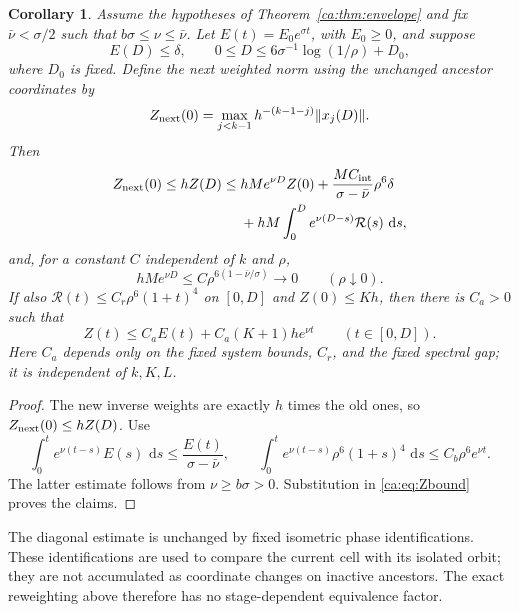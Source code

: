 \documentclass[11pt]{amsart}
\newtheorem{corollary}[theorem]{Corollary}
\theoremstyle{remark}
\numberwithin{equation}{section}
\newcommand{\dd}{\,\mathrm d}
\begin{document}
\begin{corollary}
\label{ca:cor:reset}\label{ca:cor:slack}
Assume the hypotheses of Theorem~\ref{ca:thm:envelope} and fix
$\bar\nu<\sigma/2$ such that $b\sigma\le\nu\le\bar\nu$.
Let $E(t)=E_0e^{\sigma t}$, with $E_0\ge0$, and suppose
\[
 E(D)\le\delta,\qquad
 0\le D\le6\sigma^{-1}\log(1/\rho)+D_0,
\]
where $D_0$ is fixed. Define the next weighted norm using the
unchanged ancestor coordinates by
\[
 Z_{\rm next}(0)=\max_{j<k-1}h^{-(k-1-j)}\|x_j(D)\|.
\]
Then
\begin{equation}\label{ca:eq:reset}
 \begin{split}
 Z_{\rm next}(0)\le hZ(D)
 \le{}&hMe^{\nu D}Z(0)
 +\frac{MC_{\rm int}}{\sigma-\bar\nu}\rho^6\delta\\
 &+hM\int_0^D e^{\nu(D-s)}\mathcal R(s)\,\dd s,
 \end{split}
\end{equation}
and, for a constant $C$ independent of $k$ and $\rho$,
\begin{equation}\label{ca:eq:Breset}
 hMe^{\nu D}\le C\rho^{6(1-\bar\nu/\sigma)}\longrightarrow0
       \qquad(\rho\downarrow0).
\end{equation}
If also $\mathcal R(t)\le C_r\rho^6(1+t)^4$ on $[0,D]$ and
$Z(0)\le Kh$, then there is $C_a>0$ such that
\begin{equation}\label{ca:eq:causal}
 Z(t)\le C_aE(t)+C_a(K+1)he^{\nu t}
 \qquad(t\in[0,D]).
\end{equation}
Here $C_a$ depends only on the fixed system bounds, $C_r$, and the
fixed spectral gap; it is independent of $k,K,L$.
\end{corollary}
\begin{proof}
The new inverse weights are exactly $h$ times the old ones, so
$Z_{\rm next}(0)\leq hZ(D)$. Use
\[
 \int_0^t e^{\nu(t-s)}E(s)\,\dd s
 \leq\frac{E(t)}{\sigma-\bar\nu},\qquad
 \int_0^t e^{\nu(t-s)}\rho^6(1+s)^4\,\dd s
 \leq C_b\rho^6e^{\nu t}.
\]
The latter estimate follows from $\nu\geq b\sigma>0$.
Substitution in \eqref{ca:eq:Zbound} proves the claims.
\end{proof}

The diagonal estimate is unchanged by fixed isometric phase
identifications. These identifications are used to compare the current
cell with its isolated orbit; they are not accumulated as coordinate
changes on inactive ancestors. The exact reweighting above therefore
has no stage-dependent equivalence factor.
\end{document}
